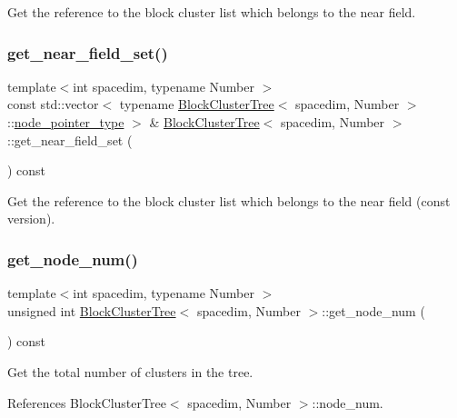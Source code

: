 Get the reference to the block cluster list which belongs to the near field. \mbox{\label{classBlockClusterTree_a6ac71437177d14012c12f7b4f354cdd1}} 
\subsubsection{\texorpdfstring{get\+\_\+near\+\_\+field\+\_\+set()}{get\_near\_field\_set()}\hspace{0.1cm}{\footnotesize\ttfamily [2/2]}}
{\footnotesize\ttfamily template$<$int spacedim, typename Number $>$ \\
const std\+::vector$<$ typename \hyperlink{classBlockClusterTree}{Block\+Cluster\+Tree}$<$ spacedim, Number $>$\+::\hyperlink{classTreeNode}{node\+\_\+pointer\+\_\+type} $>$ \& \hyperlink{classBlockClusterTree}{Block\+Cluster\+Tree}$<$ spacedim, Number $>$\+::get\+\_\+near\+\_\+field\+\_\+set (\begin{DoxyParamCaption}{ }\end{DoxyParamCaption}) const}

Get the reference to the block cluster list which belongs to the near field (const version). \mbox{\label{classBlockClusterTree_a042e040d2f6dfcbbfd70b43b8967c6f6}} 
\subsubsection{\texorpdfstring{get\+\_\+node\+\_\+num()}{get\_node\_num()}}
{\footnotesize\ttfamily template$<$int spacedim, typename Number $>$ \\
unsigned int \hyperlink{classBlockClusterTree}{Block\+Cluster\+Tree}$<$ spacedim, Number $>$\+::get\+\_\+node\+\_\+num (\begin{DoxyParamCaption}{ }\end{DoxyParamCaption}) const}

Get the total number of clusters in the tree. 

References Block\+Cluster\+Tree$<$ spacedim, Number $>$\+::node\+\_\+num.


